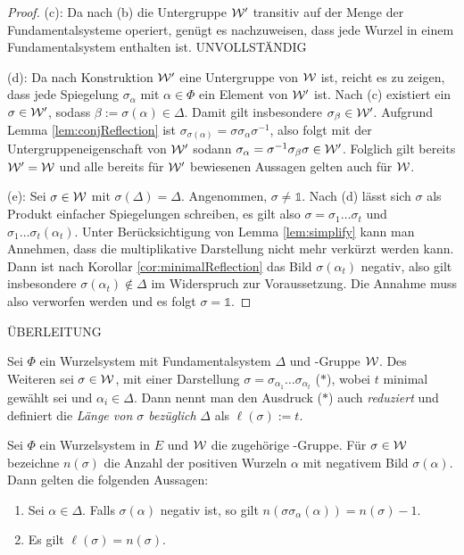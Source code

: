 \begin{proof}
  (c):
  Da nach (b) die Untergruppe $\mathcal{W}'$ transitiv auf der Menge der Fundamentalsysteme operiert, genügt es nachzuweisen, dass jede Wurzel in einem Fundamentalsystem enthalten ist.
  UNVOLLSTÄNDIG

  (d):
  Da nach Konstruktion $\mathcal{W}'$ eine Untergruppe von $\mathcal{W}$ ist, reicht es zu zeigen, dass jede Spiegelung $\sigma_\alpha$ mit $\alpha \in \Phi$ ein Element von $\mathcal{W}'$ ist.
  Nach (c) existiert ein $\sigma \in \mathcal{W}'$, sodass $\beta := \sigma(\alpha) \in \Delta$.
  Damit gilt insbesondere $\sigma_\beta \in \mathcal{W}'$.
  Aufgrund Lemma \ref{lem:conjReflection} ist $\sigma_{\sigma(\alpha)} = \sigma \sigma_\alpha \sigma^{-1}$, also folgt mit der Untergruppeneigenschaft von $\mathcal{W}'$ sodann $\sigma_\alpha = \sigma^{-1} \sigma_\beta \sigma \in \mathcal{W}'$.
  Folglich gilt bereits $\mathcal{W}' = \mathcal{W}$ und alle bereits für $\mathcal{W}'$ bewiesenen Aussagen gelten auch für $\mathcal{W}$.

  (e):
  Sei $\sigma \in \mathcal{W}$ mit $\sigma(\Delta) = \Delta$.
  Angenommen, $\sigma \neq \mathds{1}$.
  Nach (d) lässt sich $\sigma$ als Produkt einfacher Spiegelungen schreiben, es gilt also $\sigma = \sigma_1\dots\sigma_t$ und $\sigma_1 \dots \sigma_t(\alpha_t)$. 
  Unter Berücksichtigung von Lemma \ref{lem:simplify} kann man Annehmen, dass die multiplikative Darstellung nicht mehr verkürzt werden kann.
  Dann ist nach Korollar \ref{cor:minimalReflection} das Bild $\sigma(\alpha_t)$ negativ, also gilt insbesondere $\sigma(\alpha_t) \not\in \Delta$ im Widerspruch zur Voraussetzung.
  Die Annahme muss also verworfen werden und es folgt $\sigma = \mathds{1}$.
\end{proof}

ÜBERLEITUNG

\begin{defn}
  Sei $\Phi$ ein Wurzelsystem mit Fundamentalsystem $\Delta$ und \weyl\hyp{}Gruppe $\mathcal{W}$. 
  Des Weiteren sei $\sigma \in \mathcal{W}$, mit einer Darstellung $\sigma = \sigma_{\alpha_1}\dots\sigma_{\alpha_t}$ ($\ast$), wobei $t$ minimal gewählt sei und $\alpha_i \in \Delta$. 
  Dann nennt man den Ausdruck ($\ast$) auch \emph{reduziert} und definiert die \emph{Länge von $\sigma$ bezüglich} $\Delta$ als $\ell(\sigma) := t$.
\end{defn}

\begin{lem}
  \label{lem:lengthAndNegativeRoots}
  Sei $\Phi$ ein Wurzelsystem in $E$ und $\mathcal{W}$ die zugehörige \weyl\hyp{}Gruppe.
  Für $\sigma \in \mathcal{W}$ bezeichne $n(\sigma)$ die Anzahl der positiven Wurzeln $\alpha$ mit negativem Bild $\sigma(\alpha)$.
  Dann gelten die folgenden Aussagen:
  \begin{enumerate}[(1)]
    \item Sei $\alpha \in \Delta$. Falls $\sigma(\alpha)$ negativ ist, so gilt $n(\sigma\sigma_\alpha(\alpha)) = n(\sigma) - 1$.
    \item Es gilt $\ell(\sigma) = n(\sigma)$.
  \end{enumerate}
\end{lem}

